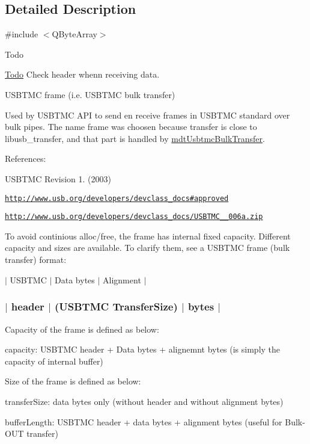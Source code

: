 \subsection{Detailed Description}
\#include $<$\-Q\-Byte\-Array$>$ 

\begin{DoxyRefDesc}{Todo}
\item[\hyperlink{todo__todo000047}{Todo}]Check header whenn receiving data. \end{DoxyRefDesc}


U\-S\-B\-T\-M\-C frame (i.\-e. U\-S\-B\-T\-M\-C bulk transfer)

Used by U\-S\-B\-T\-M\-C A\-P\-I to send en receive frames in U\-S\-B\-T\-M\-C standard over bulk pipes. The name frame was choosen because transfer is close to libusb\-\_\-transfer, and that part is handled by \hyperlink{classmdt_usbtmc_bulk_transfer}{mdt\-Usbtmc\-Bulk\-Transfer}.

References\-:
\begin{DoxyItemize}
\item U\-S\-B\-T\-M\-C Revision 1. (2003)
\item \href{http://www.usb.org/developers/devclass_docs#approved}{\tt http\-://www.\-usb.\-org/developers/devclass\-\_\-docs\#approved}
\item \href{http://www.usb.org/developers/devclass_docs/USBTMC_1_006a.zip}{\tt http\-://www.\-usb.\-org/developers/devclass\-\_\-docs/\-U\-S\-B\-T\-M\-C\-\_\-\_\-006a.\-zip}
\end{DoxyItemize}

To avoid continious alloc/free, the frame has internal fixed capacity. Different capacity and sizes are available. To clarify them, see a U\-S\-B\-T\-M\-C frame (bulk transfer) format\-: 

 $\vert$ U\-S\-B\-T\-M\-C $\vert$ Data bytes $\vert$ Alignment $\vert$ \subsubsection*{$\vert$ header $\vert$ (U\-S\-B\-T\-M\-C Transfer\-Size) $\vert$ bytes $\vert$ }

Capacity of the frame is defined as below\-:
\begin{DoxyItemize}
\item capacity\-: U\-S\-B\-T\-M\-C header + Data bytes + alignemnt bytes (is simply the capacity of internal buffer)
\end{DoxyItemize}

Size of the frame is defined as below\-:
\begin{DoxyItemize}
\item transfer\-Size\-: data bytes only (without header and without alignment bytes)
\item buffer\-Length\-: U\-S\-B\-T\-M\-C header + data bytes + alignment bytes (useful for Bulk-\/\-O\-U\-T transfer)
\end{DoxyItemize}

